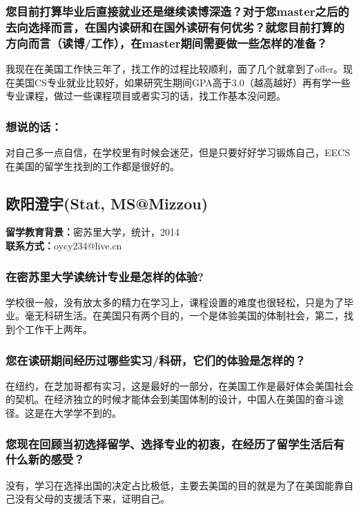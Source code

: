 \documentclass[a4paper,UTF8]{book}
\begin{document}
    \subsubsection*{您目前打算毕业后直接就业还是继续读博深造？对于您master之后的去向选择而言，在国内读研和在国外读研有何优劣？就您目前打算的方向而言（读博/工作），在master期间需要做一些怎样的准备？}
    我现在在美国工作快三年了，找工作的过程比较顺利，面了几个就拿到了offer。现在美国CS专业就业比较好，如果研究生期间GPA高于3.0（越高越好）再有学一些专业课程，做过一些课程项目或者实习的话，找工作基本没问题。                
    
    \subsubsection{想说的话：}
    对自己多一点自信，在学校里有时候会迷茫，但是只要好好学习锻炼自己，EECS在美国的留学生找到的工作都是很好的。

\clearpage
\subsection{欧阳澄宇(Stat, MS@Mizzou)}
    \textbf{留学教育背景：}密苏里大学，统计，2014\\
    \textbf{联系方式：}oycy234@live.cn

    \subsubsection*{在密苏里大学读统计专业是怎样的体验?}
    学校很一般，没有放太多的精力在学习上，课程设置的难度也很轻松，只是为了毕业。毫无科研生活。在美国只有两个目的，一个是体验美国的体制社会，第二，找到个工作干上两年。

    \subsubsection*{您在读研期间经历过哪些实习/科研，它们的体验是怎样的？}
    在纽约，在芝加哥都有实习，这是最好的一部分，在美国工作是最好体会美国社会的契机。在经济独立的时候才能体会到美国体制的设计，中国人在美国的奋斗途径。这是在大学学不到的。

    \subsubsection*{您现在回顾当初选择留学、选择专业的初衷，在经历了留学生活后有什么新的感受？}
    没有，学习在选择出国的决定占比极低，主要去美国的目的就是为了在美国能靠自己没有父母的支援活下来，证明自己。
\end{document}
